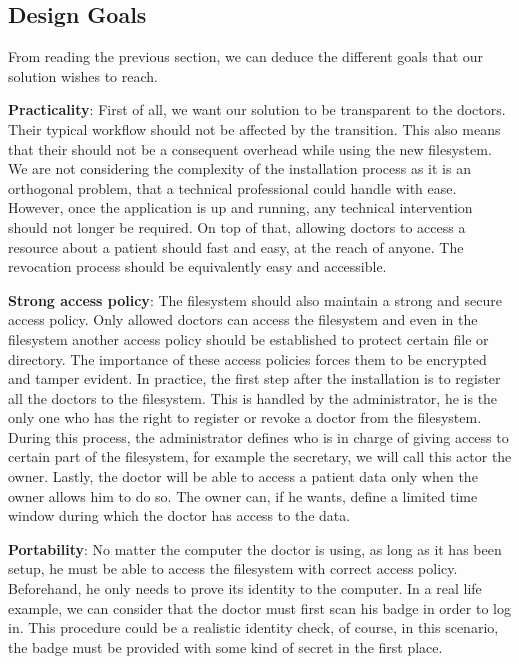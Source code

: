 \documentclass[../main.tex]{subfiles}
\begin{document}
\subsection{Design Goals}
\par From reading the previous section, we can deduce the different goals that our solution wishes to reach.
\par \textbf{Practicality}: First of all, we want our solution to be transparent to the doctors. Their typical workflow should not be affected by the transition. This also means that their should not be a consequent overhead while using the new filesystem. We are not considering the complexity of the installation process as it is an orthogonal problem, that a technical professional could handle with ease. However, once the application is up and running, any technical intervention should not longer be required. On top of that, allowing doctors to access a resource about a patient should fast and easy, at the reach of anyone. The revocation process should be equivalently easy and accessible.
\par \textbf{Strong access policy}: The filesystem should also maintain a strong and secure access policy. Only allowed doctors can access the filesystem and even in the filesystem another access policy should be established to protect certain file or directory. The importance of these access policies forces them to be encrypted and tamper evident. In practice, the first step after the installation is to register all the doctors to the filesystem. This is handled by the administrator, he is the only one who has the right to register or revoke a doctor from the filesystem. During this process, the administrator defines who is in charge of giving access to certain part of the filesystem, for example the secretary, we will call this actor the owner. Lastly, the doctor will be able to access a patient data only when the owner allows him to do so. The owner can, if he wants, define a limited time window during which the doctor has access to the data.
\par \textbf{Portability}: No matter the computer the doctor is using, as long as it has been setup, he must be able to access the filesystem with correct access policy. Beforehand, he only needs to prove its identity to the computer. In a real life example, we can consider that the doctor must first scan his badge in order to log in. This procedure could be a realistic identity check, of course, in this scenario, the badge must be provided with some kind of secret in the first place.
\end{document}
